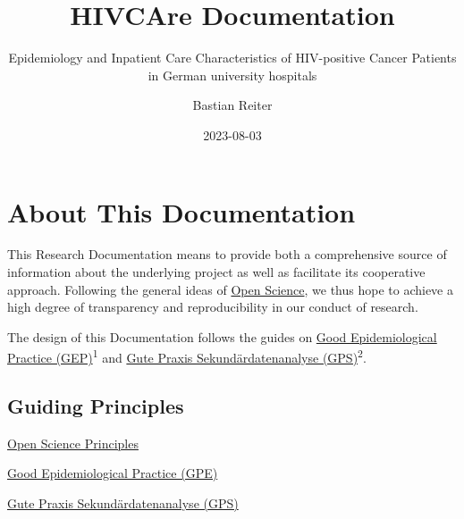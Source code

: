 \documentclass[
  letterpaper,
  DIV=11,
  numbers=noendperiod]{scrreprt}
\title{HIVCAre Documentation}
\subtitle{Epidemiology and Inpatient Care Characteristics of
HIV-positive Cancer Patients in German university hospitals}
\author{Bastian Reiter}
\date{2023-08-03}
\renewcommand*\contentsname{Table of contents}
\newcommand\contentsname{Table of contents}
\begin{document}
\maketitle
\ifdefined\Shaded\renewenvironment{Shaded}{\begin{tcolorbox}[borderline west={3pt}{0pt}{shadecolor}, interior hidden, enhanced, boxrule=0pt, sharp corners, breakable, frame hidden]}{\end{tcolorbox}}\fi

\renewcommand*\contentsname{Table of contents}
{
\hypersetup{linkcolor=}
\setcounter{tocdepth}{2}
\tableofcontents
}

\hypertarget{about-this-documentation}{%
\chapter{About This Documentation}\label{about-this-documentation}}

\hfill\break

This Research Documentation means to provide both a comprehensive source
of information about the underlying project as well as facilitate its
cooperative approach. Following the general ideas of
\href{https://www.fosteropenscience.eu/learning/what-is-open-science/\#/id/5ab8ea32dd1827131b90e3ac}{Open
Science}, we thus hope to achieve a high degree of transparency and
reproducibility in our conduct of research.

The design of this Documentation follows the guides on
\href{https://www.dgepi.de/assets/Good-Epidemiological-Practice-GEP-EurJ-Epidemiol-2019.pdf}{Good
Epidemiological Practice (GEP)}\textsuperscript{1} and
\href{https://www.dgepi.de/assets/Leitlinien-und-Empfehlungen/GPS_revision2-final_august2014.pdf}{Gute
Praxis Sekundärdatenanalyse (GPS)}\textsuperscript{2}.

\hfill\break

\hypertarget{guiding-principles}{%
\section{Guiding Principles}\label{guiding-principles}}

\href{https://www.fosteropenscience.eu/learning/what-is-open-science/\#/id/5ab8ea32dd1827131b90e3ac}{Open
Science Principles}

\href{https://www.dgepi.de/assets/Good-Epidemiological-Practice-GEP-EurJ-Epidemiol-2019.pdf}{Good
Epidemiological Practice (GPE)}

\href{https://www.dgepi.de/assets/Leitlinien-und-Empfehlungen/GPS_revision2-final_august2014.pdf}{Gute
Praxis Sekundärdatenanalyse (GPS)}
\end{document}
